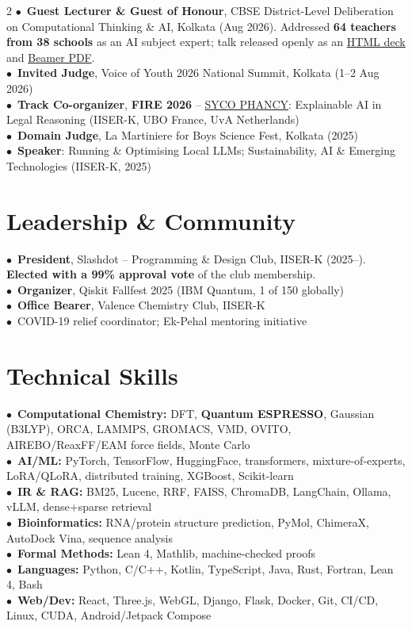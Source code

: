 \documentclass[a4paper,9pt]{article}
\begin{document}
\begin{paracol}{2}
	 {\tiny
	  $\bullet$~\textbf{Guest Lecturer \& Guest of Honour}, CBSE District-Level Deliberation on Computational Thinking \& AI, Kolkata (Aug 2026). Addressed \textbf{64 teachers from 38 schools} as an AI subject expert; talk released openly as an \href{https://shuvam-banerji-seal.github.io/ai-in-real-world-context/}{HTML deck} and \href{https://shuvam-banerji-seal.github.io/ai-in-real-world-context/main.pdf}{Beamer PDF}.\\
	  $\bullet$~\textbf{Invited Judge}, Voice of Youth 2026 National Summit, Kolkata (1--2 Aug 2026)\\
	  $\bullet$~\textbf{Track Co-organizer}, \textbf{FIRE 2026} -- \href{https://sycolex.com/}{SYCO PHANCY}: Explainable AI in Legal Reasoning (IISER-K, UBO France, UvA Netherlands)\\
	  $\bullet$~\textbf{Domain Judge}, La Martiniere for Boys Science Fest, Kolkata (2025)\\
	  $\bullet$~\textbf{Speaker}: Running \& Optimising Local LLMs; Sustainability, AI \& Emerging Technologies (IISER-K, 2025)
	 }

	\section{Leadership \& Community}

	 {\tiny
	  $\bullet$~\textbf{President}, Slashdot -- Programming \& Design Club, IISER-K (2025--). \textbf{Elected with a 99\% approval vote} of the club membership.\\
	  $\bullet$~\textbf{Organizer}, Qiskit Fallfest 2025 (IBM Quantum, 1 of 150 globally)\\
	  $\bullet$~\textbf{Office Bearer}, Valence Chemistry Club, IISER-K\\
	  $\bullet$~COVID-19 relief coordinator; Ek-Pehal mentoring initiative
	 }

	\section{Technical Skills}

	 {\tiny
	  $\bullet$~\textbf{Computational Chemistry:} DFT, \textbf{Quantum ESPRESSO}, Gaussian (B3LYP), ORCA, LAMMPS, GROMACS, VMD, OVITO, AIREBO/ReaxFF/EAM force fields, Monte Carlo\\
	  $\bullet$~\textbf{AI/ML:} PyTorch, TensorFlow, HuggingFace, transformers, mixture-of-experts, LoRA/QLoRA, distributed training, XGBoost, Scikit-learn\\
	  $\bullet$~\textbf{IR \& RAG:} BM25, Lucene, RRF, FAISS, ChromaDB, LangChain, Ollama, vLLM, dense+sparse retrieval\\
	  $\bullet$~\textbf{Bioinformatics:} RNA/protein structure prediction, PyMol, ChimeraX, AutoDock Vina, sequence analysis\\
	  $\bullet$~\textbf{Formal Methods:} Lean 4, Mathlib, machine-checked proofs\\
	  $\bullet$~\textbf{Languages:} Python, C/C++, Kotlin, TypeScript, Java, Rust, Fortran, Lean 4, Bash\\
	  $\bullet$~\textbf{Web/Dev:} React, Three.js, WebGL, Django, Flask, Docker, Git, CI/CD, Linux, CUDA, Android/Jetpack Compose
	 }


\end{paracol}
\end{document}

